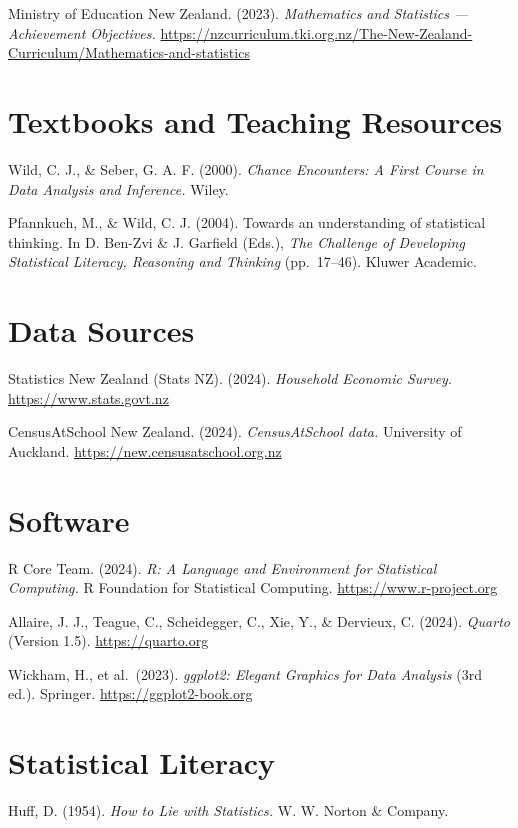 \documentclass[
  11pt,
  a4paper,
  oneside,
  open=any]{scrbook}
\begin{document}
Ministry of Education New Zealand. (2023). \emph{Mathematics and
Statistics --- Achievement Objectives.}
\url{https://nzcurriculum.tki.org.nz/The-New-Zealand-Curriculum/Mathematics-and-statistics}

\section{Textbooks and Teaching
Resources}\label{textbooks-and-teaching-resources}

Wild, C. J., \& Seber, G. A. F. (2000). \emph{Chance Encounters: A First
Course in Data Analysis and Inference.} Wiley.

Pfannkuch, M., \& Wild, C. J. (2004). Towards an understanding of
statistical thinking. In D. Ben-Zvi \& J. Garfield (Eds.), \emph{The
Challenge of Developing Statistical Literacy, Reasoning and Thinking}
(pp.~17--46). Kluwer Academic.

\section{Data Sources}\label{data-sources}

Statistics New Zealand (Stats NZ). (2024). \emph{Household Economic
Survey.} \url{https://www.stats.govt.nz}

CensusAtSchool New Zealand. (2024). \emph{CensusAtSchool data.}
University of Auckland. \url{https://new.censusatschool.org.nz}

\section{Software}\label{software}

R Core Team. (2024). \emph{R: A Language and Environment for Statistical
Computing.} R Foundation for Statistical Computing.
\url{https://www.r-project.org}

Allaire, J. J., Teague, C., Scheidegger, C., Xie, Y., \& Dervieux, C.
(2024). \emph{Quarto} (Version 1.5). \url{https://quarto.org}

Wickham, H., et al.~(2023). \emph{ggplot2: Elegant Graphics for Data
Analysis} (3rd ed.). Springer. \url{https://ggplot2-book.org}

\section{Statistical Literacy}\label{statistical-literacy}

Huff, D. (1954). \emph{How to Lie with Statistics.} W. W. Norton \&
Company.
\end{document}
